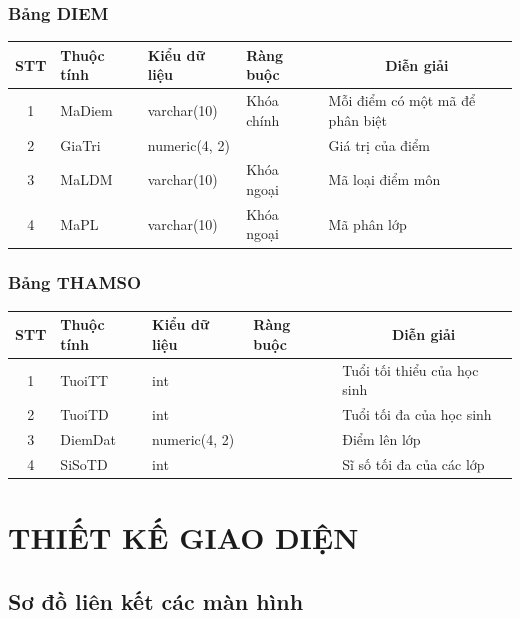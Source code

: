 \documentclass[a4paper]{article}
\begin{document}
\subsubsection{Bảng DIEM}
\begin{table}[H]
\centering
\renewcommand{\arraystretch}{1.5}
\setlength{\tabcolsep}{12pt}
\begin{tabular}{|c|l|l|l|p{5cm}|}
\hline
\textbf{STT} & \textbf{Thuộc tính} & \textbf{Kiểu dữ liệu} & \textbf{Ràng buộc} & \multicolumn{1}{|c|}{\textbf{Diễn giải}} \\
\hline
1 & MaDiem & varchar(10) & Khóa chính & Mỗi điểm có một mã để phân biệt \\
\hline
2 & GiaTri & numeric(4, 2) & & Giá trị của điểm \\
\hline 
3 & MaLDM & varchar(10) & Khóa ngoại & Mã loại điểm môn \\
\hline 
4 & MaPL & varchar(10) & Khóa ngoại & Mã phân lớp \\
\hline
\end{tabular}
\end{table}

\subsubsection{Bảng THAMSO}
\begin{table}[H]
\centering
\renewcommand{\arraystretch}{1.5}
\setlength{\tabcolsep}{12pt}
\begin{tabular}{|c|l|l|l|p{5cm}|}
\hline
\textbf{STT} & \textbf{Thuộc tính} & \textbf{Kiểu dữ liệu} & \textbf{Ràng buộc} & \multicolumn{1}{|c|}{\textbf{Diễn giải}} \\
\hline
1 & TuoiTT & int &  & Tuổi tối thiểu của học sinh \\
\hline
2 & TuoiTD & int & & Tuổi tối đa của học sinh \\
\hline 
3 & DiemDat & numeric(4, 2) & & Điểm lên lớp \\
\hline
4 & SiSoTD & int & & Sĩ số tối đa của các lớp \\
\hline
\end{tabular}
\end{table}


\section{THIẾT KẾ GIAO DIỆN}
	\subsection{Sơ đồ liên kết các màn hình}
\end{document}
